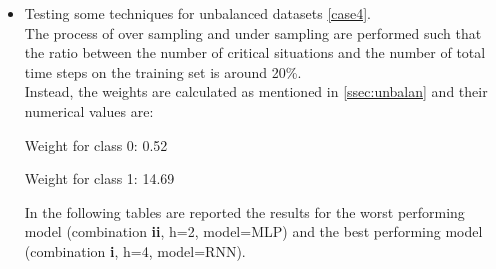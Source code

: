 \begin{itemize}
    \item Testing some techniques for unbalanced datasets \ref{case4}. \\
    
    The process of over sampling and under sampling are performed such that the ratio between the number of critical situations and the number of total time steps on the training set is around 20\%.\\
    Instead, the weights are calculated as mentioned in \ref{ssec:unbalan} and their numerical values are:\\
    \begin{minipage}{1\linewidth}
        \begin{algorithm}[H]
            \STATE Weight for class 0: 0.52
            
            \STATE Weight for class 1: 14.69
        \end{algorithm}
    \end{minipage}
    
    In the following tables are reported the results for the worst performing model (combination \textbf{ii}, h=2, model=\gls{MLP}) and the best performing model (combination \textbf{i}, h=4, model=\gls{RNN}).
    

\end{itemize}
